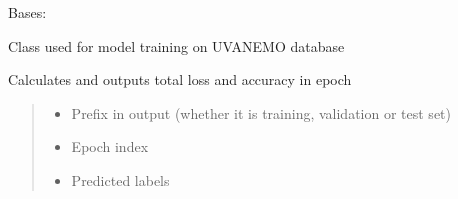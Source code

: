 \documentclass[letterpaper,10pt,english]{sphinxmanual}
\begin{document}
\begin{fulllineitems}
\label{\detokenize{net:net.UVANEMO}}
\pysigstartsignatures
{}
\pysigstopsignatures
\sphinxAtStartPar
Bases: 

\sphinxAtStartPar
Class used for model training on UVA\sphinxhyphen{}NEMO database

\begin{fulllineitems}
\label{\detokenize{net:net.UVANEMO.__calc_and_out_total_accloss}}
\pysigstartsignatures
{}
\pysigstopsignatures
\sphinxAtStartPar
Calculates and outputs total loss and accuracy in epoch
\begin{quote}\begin{description}
\begin{itemize}
\item {} 
\sphinxAtStartPar
{} \textendash{} Prefix in output (whether it is training, validation or test set)

\item {} 
\sphinxAtStartPar
{} \textendash{} Epoch index

\item {} 
\sphinxAtStartPar
{} \textendash{} Predicted labels


\end{itemize}
\end{description}
\end{quote}
\end{fulllineitems}
\end{fulllineitems}
\end{document}
